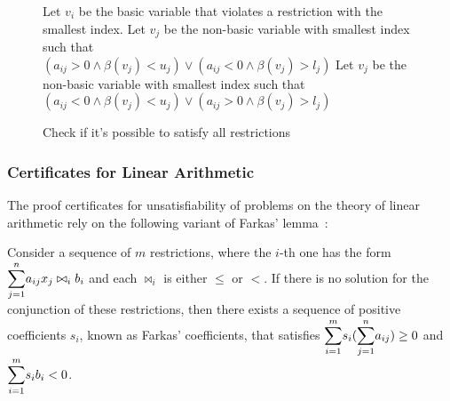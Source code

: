\begin{figure}[t]
\begin{algorithmic}[1]
    \State Let $v_{i}$ be the basic variable that violates a restriction with the smallest index.
      \State {}
    \EndIf
      \State Let $v_{j}$ be the non-basic variable with smallest index such that\\
      \qquad \qquad $(a_{ij} > 0 \wedge \beta(v_{j}) < u_{j}) \vee (a_{ij} < 0 \wedge \beta(v_{j}) > l_{j})$
        \State {}
      \EndIf
      \State {}
        \State Let $v_{j}$ be the non-basic variable with smallest index such that\\
        \qquad \qquad $(a_{ij} < 0 \wedge \beta(v_{j}) < u_{j}) \vee (a_{ij} > 0 \wedge \beta(v_{j}) > l_{j})$
          \State {}
        \EndIf
        \State {}
    \EndIf
    \State {}
  \EndFunction

\end{algorithmic}
\caption{Check if it's possible to satisfy all restrictions}\label{check_lra}
\end{figure}

\subsubsection{Certificates for Linear Arithmetic}

The proof certificates for unsatisfiability of problems on the theory of linear arithmetic rely on the following variant of Farkas' lemma~\cite{farkas_ref}:

\begin{theorem}\label{farkas_lemma}
  Consider a sequence of $m$ restrictions, where the $i$-th one has the form $\mathlarger{\sum}_{j = 1}^{n} a_{ij} x_{j} \bowtie_{i} b_{i}$ and each $\bowtie_{i}$ is either $\le$ or $<$. If there is no solution for the conjunction of these restrictions, then there exists a sequence of positive coefficients $s_{i}$, known as Farkas' coefficients, that satisfies $\mathlarger{\sum}_{i = 1}^{m} s_{i} (\mathlarger{\sum}_{j = 1}^{n} a_{ij}) \ge 0$ and $\mathlarger{\sum}_{i = 1}^{m} s_{i} b_{i} < 0$.
\end{theorem}

